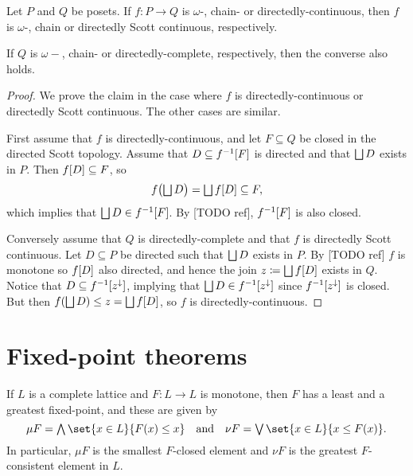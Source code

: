 \documentclass[a4paper, 11pt, article, danish, oneside]{memoir}
\DeclarePairedDelimiter{\auxdelimbracket}{[}{]}
\DeclareMathOperator*{\smallbigvee}{\textstyle\bigvee}
\DeclareMathOperator*{\bigjoin}{\mathchoice
    {\smallbigvee}%
    {\bigvee}%
    {\bigvee}%
    {\bigvee}%
}
\DeclareMathOperator*{\smallbigsqcup}{\textstyle\bigsqcup}
\DeclareMathOperator*{\bigdjoin}{\mathchoice
    {\smallbigsqcup}%
    {\bigsqcup}%
    {\bigsqcup}%
    {\bigsqcup}%
}
\DeclareMathOperator*{\smallbigwedge}{\textstyle\bigwedge}
\DeclareMathOperator*{\bigmeet}{\mathchoice
    {\smallbigwedge}%
    {\bigwedge}%
    {\bigwedge}%
    {\bigwedge}%
}
\newcommand{\defeq}{\coloneqq}
\newcommand{\preim}[2][]{^{-1}\auxdelimbracket[#1]{#2}}
\newcommand{\image}[2][]{\auxdelimbracket[#1]{#2}}
\begin{document}
\begin{proposition}
    Let $P$ and $Q$ be posets. If $f \colon P \to Q$ is $\omega$-, chain- or directedly-continuous, then $f$ is $\omega$-, chain or directedly Scott continuous, respectively.

    If $Q$ is $\omega-$, chain- or directedly-complete, respectively, then the converse also holds.
\end{proposition}

\begin{proof}
    We prove the claim in the case where $f$ is directedly-continuous or directedly Scott continuous. The other cases are similar.
    
    First assume that $f$ is directedly-continuous, and let $F \subseteq Q$ be closed in the directed Scott topology. Assume that $D \subseteq f\preim{F}$ is directed and that $\bigdjoin D$ exists in $P$. Then $f\image{D} \subseteq F$, so
    \begin{equation*}
        f \bigl( \bigdjoin D \bigr)
            = \bigdjoin f\image{D}
            \subseteq F,
    \end{equation*}
    which implies that $\bigdjoin D \in f\preim{F}$. By [TODO ref], $f\preim{F}$ is also closed.

    Conversely assume that $Q$ is directedly-complete and that $f$ is directedly Scott continuous. Let $D \subseteq P$ be directed such that $\bigdjoin D$ exists in $P$. By [TODO ref] $f$ is monotone so $f\image{D}$ also directed, and hence the join $z \defeq \bigdjoin f\image{D}$ exists in $Q$. Notice that $D \subseteq f\preim{z^\downarrow}$, implying that $\bigdjoin D \in f\preim{z^\downarrow}$ since $f\preim{z^\downarrow}$ is closed. But then $f(\bigdjoin D) \leq z = \bigdjoin f\image{D}$, so $f$ is directedly-continuous.
\end{proof}


\section{Fixed-point theorems}

\begin{theorem}
    If $L$ is a complete lattice and $F \colon L \to L$ is monotone, then $F$ has a least and a greatest fixed-point, and these are given by
    \begin{equation*}
        \mu F
            = \bigmeet \set{x \in L}{F(x) \leq x}
        \quad \text{and} \quad
        \nu F
            = \bigjoin \set{x \in L}{x \leq F(x)}.
    \end{equation*}
    In particular, $\mu F$ is the smallest $F$-closed element and $\nu F$ is the greatest $F$-consistent element in $L$.
\end{theorem}
\end{document}
